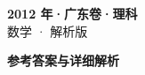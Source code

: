 \documentclass[zihao=-4, a4paper]{ctexart}
\begin{document}
\begin{center}
  {\Large\bfseries 2012 年·广东卷·理科}\\[4pt]
  {\large 数学 · 解析版}
\end{center}
\medskip
{}

\clearpage
{}
\begin{center}{\Large\bfseries 参考答案与详细解析}\end{center}
\medskip

\end{document}

